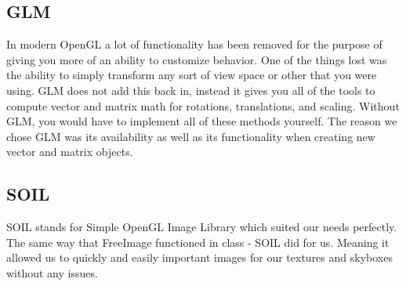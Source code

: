 \documentclass[paper=a4, fontsize=11pt]{scrartcl}
\numberwithin{equation}{section}		%
\numberwithin{figure}{section}			%
\numberwithin{table}{section}				%
\begin{document}
\subsection{GLM}
In modern OpenGL a lot of functionality has been removed for the purpose of giving you more of an ability to customize behavior. One of the things lost was the ability to simply transform any sort of view space or other that you were using. GLM does not add this back in, instead it gives you all of the tools to compute vector and matrix math for rotations, translations, and scaling. Without GLM, you would have to implement all of these methods yourself. The reason we chose GLM was its availability as well as its functionality when creating new vector and matrix objects.
\subsection{SOIL}
SOIL stands for Simple OpenGL Image Library which suited our needs perfectly. The same way that FreeImage functioned in class - SOIL did for us. Meaning it allowed us to quickly and easily important images for our textures and skyboxes without any issues.

\end{document}
